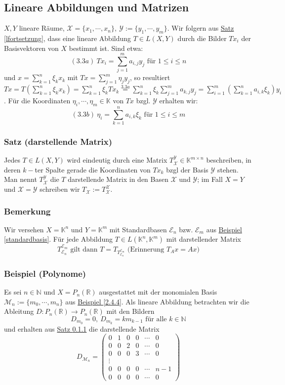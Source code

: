 \subsection{Lineare Abbildungen und Matrizen}
$X,Y$ lineare Räume, $\mathcal{X}=\{x_1,\cdots ,x_n\},\ \mathcal{Y}:=\{y_1,\cdots ,y_m\}$.  Wir folgern aus \hyperref[lfortsetzung]{Satz \ref*{lfortsetzung}}, dass eine lineare Abbildung $T\in L(X,Y)$ durch die Bilder $Tx_i$ der Basisvektoren von $X$ bestimmt ist.  Sind etwa:\\
\[(3.3a)\ Tx_i = \sum_{j=1}^m a_{i,j} y_j\text{ für }1\leq i\leq n\]
und $x=\sum_{k=1}^n\xi _k x_k$ mit $Tx=\sum_{j=1}^m \eta _j y_j$, so resultiert $Tx=T(\sum_{k=1}^n\xi _k x_k)=\sum_{k=1}^n \xi _k Tx_k \stackrel{3.3a}{=} \sum_{k=1}^n\xi _k\sum_{j=1}^ma_{k,j}y_j=\sum_{i=1}^m(\sum_{k=1}^na_{i,k}\xi_k)y_i$.  Für die Koordinaten $\eta _i,\cdots ,\eta _m\in\mathbb{K}$ von $Tx$ bzgl. $\mathcal{Y}$ erhalten wir:\\
\[(3.3b)\ \eta _i=\sum_{k=1}^na_{i,k}\xi _k\text{ für }1\leq i\leq m\]
\subsubsection{Satz (darstellende Matrix)}
\label{Mdarstellend}
Jedes $T\in L(X,Y)$ wird eindeutig durch eine Matrix $T_\mathcal{X}^\mathcal{Y}\in\mathbb{K}^{m\times n}$ beschreiben, in deren $k-$ter Spalte gerade die Koordinaten von $Tx_k$ bzgl der Basis $\mathcal{Y}$ stehen.  Man nennt $T_\mathcal{X}^\mathcal{Y}$ die $T$ darstellende Matrix in den Basen $\mathcal{X}$ und $\mathcal{Y}$; im Fall $X=Y$ und $\mathcal{X}=\mathcal{Y}$ schreiben wir $T_\mathcal{X}:=T^\mathcal{X}_\mathcal{X}$.
\subsubsection{Bemerkung}
Wir versehen $X=\mathbb{K}^n$ und $Y=\mathbb{K}^m$ mit Standardbasen $\mathcal{E}_n$ bzw. $\mathcal{E}_m$ aus \hyperref[standardbasis]{Beispiel \ref*{standardbasis}}.  Für jede Abbildung $T\in L(\mathbb{K}^n,\mathbb{K}^m)$ mit darstellender Matrix \[T^{\mathcal{E}_m}_{\mathcal{E}_n}\text{ gilt dann }T=T_{T_{\mathcal{E}_n}^{\mathcal{E}_m}}\text{ (Erinnerung }T_Ax=Ax)\]
\subsubsection{Beispiel (Polynome)}
Es sei $n\in \mathbb{N}$ und $X=P_n(\mathbb{R})$ ausgestattet mit der monomialen Basis $\mathcal{M}_n:=\{m_0,\cdots ,m_n\}$ aus \hyperref[2.4.4]{Beispiel \ref*{2.4.4}}.  Als lineare Abbildung betrachten wir die Ableitung $D:P_n(\mathbb{R})\rightarrow P_n(\mathbb{R})$ mit den Bildern
\[D_{m_0}=0,\ D_{m_k}=km_{k-1}\text{ für alle }k\in \mathbb{N}\]
und erhalten aus \hyperref[Mdarstellend]{Satz \ref*{Mdarstellend}} die darstellende Matrix
\[ D_{\mathcal{M}_n}=\begin{pmatrix}0 & 1 & 0 & 0 &\cdots &0\\ 0 & 0& 2 & 0 &\cdots &0\\ 0& 0& 0& 3&\cdots &0\\ \vdots \\ 0 & 0& 0 &0 & \cdots & n-1\\ 0 & 0& 0 &0 & \cdots & 0\end{pmatrix}\]
